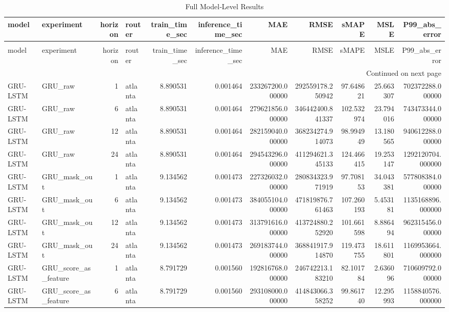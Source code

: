 \begin{longtable}{llrlrrrrrrr}
\caption{Full Model‑Level Results} \label{tab:full_model_results} \\
\toprule
model & experiment & horizon & router & train\_time\_sec & inference\_time\_sec & MAE & RMSE & sMAPE & MSLE & P99\_abs\_error \\
\midrule
\endfirsthead
\caption[]{Full Model‑Level Results} \\
\toprule
model & experiment & horizon & router & train\_time\_sec & inference\_time\_sec & MAE & RMSE & sMAPE & MSLE & P99\_abs\_error \\
\midrule
\endhead
\midrule
\multicolumn{11}{r}{Continued on next page} \\
\midrule
\endfoot
\bottomrule
\endlastfoot
GRU-LSTM & GRU\_raw & 1 & atlanta & 8.890531 & 0.001464 & 233267200.000000 & 292559178.250942 & 97.648621 & 25.663307 & 702372288.000000 \\
GRU-LSTM & GRU\_raw & 6 & atlanta & 8.890531 & 0.001464 & 279621856.000000 & 346442400.841337 & 102.532974 & 23.794016 & 743473344.000000 \\
GRU-LSTM & GRU\_raw & 12 & atlanta & 8.890531 & 0.001464 & 282159040.000000 & 368234274.914073 & 98.994949 & 13.180565 & 940612288.000000 \\
GRU-LSTM & GRU\_raw & 24 & atlanta & 8.890531 & 0.001464 & 294543296.000000 & 411294621.345133 & 124.466415 & 19.253147 & 1292120704.000000 \\
GRU-LSTM & GRU\_mask\_out & 1 & atlanta & 9.134562 & 0.001473 & 227326032.000000 & 280834323.971919 & 97.708153 & 34.043381 & 577808384.000000 \\
GRU-LSTM & GRU\_mask\_out & 6 & atlanta & 9.134562 & 0.001473 & 384055104.000000 & 471819876.761463 & 107.260193 & 5.453181 & 1135168896.000000 \\
GRU-LSTM & GRU\_mask\_out & 12 & atlanta & 9.134562 & 0.001473 & 313791616.000000 & 413724880.252920 & 101.661598 & 8.886494 & 962315456.000000 \\
GRU-LSTM & GRU\_mask\_out & 24 & atlanta & 9.134562 & 0.001473 & 269183744.000000 & 368841917.914870 & 119.473755 & 18.611801 & 1169953664.000000 \\
GRU-LSTM & GRU\_score\_as\_feature & 1 & atlanta & 8.791729 & 0.001560 & 192816768.000000 & 246742213.183210 & 82.101784 & 2.636096 & 710609792.000000 \\
GRU-LSTM & GRU\_score\_as\_feature & 6 & atlanta & 8.791729 & 0.001560 & 293108000.000000 & 414843066.358252 & 99.861740 & 12.295993 & 1158840576.000000 \\

\end{longtable}
